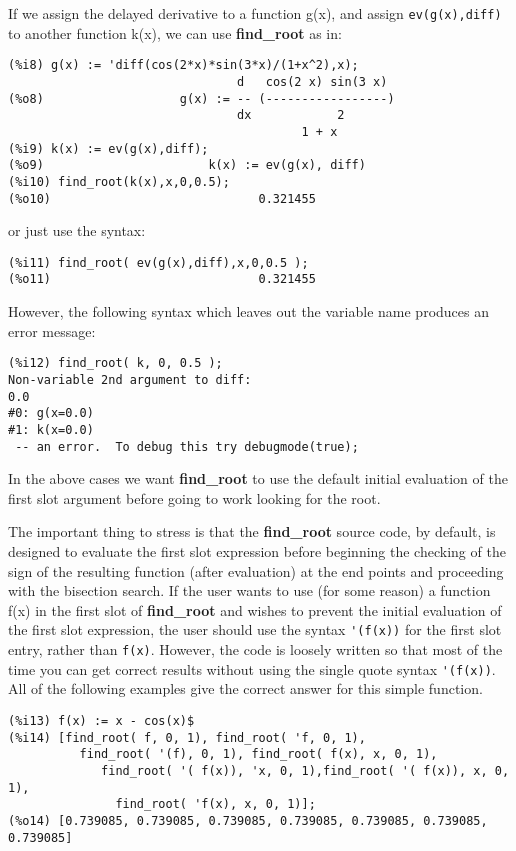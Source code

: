 \documentclass[12pt]{article}
\begin{document}
\normalsize
If we assign the delayed derivative to a function g(x), and
  assign \verb|ev(g(x),diff)| to another function k(x), we can
  use \textbf{find\_root} as in:
\small
\begin{verbatim}
(%i8) g(x) := 'diff(cos(2*x)*sin(3*x)/(1+x^2),x);
                                d   cos(2 x) sin(3 x)
(%o8)                   g(x) := -- (-----------------)
                                dx            2
                                         1 + x
(%i9) k(x) := ev(g(x),diff);
(%o9)                       k(x) := ev(g(x), diff)
(%i10) find_root(k(x),x,0,0.5);
(%o10)                             0.321455
\end{verbatim}
\normalsize
or just use the syntax:
\small
\begin{verbatim}
(%i11) find_root( ev(g(x),diff),x,0,0.5 );
(%o11)                             0.321455
\end{verbatim}
\normalsize
However, the following syntax which leaves out the variable name
   produces an error message:
\small
\begin{verbatim}
(%i12) find_root( k, 0, 0.5 );
Non-variable 2nd argument to diff:
0.0
#0: g(x=0.0)
#1: k(x=0.0)
 -- an error.  To debug this try debugmode(true);
\end{verbatim}
\normalsize

In the above cases we want \textbf{find\_root} to use the default initial
  evaluation of the first slot argument before going to work looking for the root.

The important thing to stress is that the \textbf{find\_root} source code, by default, is designed
  to evaluate the first slot expression before beginning the checking of the sign of the resulting
  function (after evaluation) at the end points and proceeding with the bisection search.
If the user wants to use (for some reason) a function f(x) in the first slot of \textbf{find\_root}
  and wishes to prevent the initial evaluation of the first slot expression, the user
  should use the syntax \verb|'(f(x))| for the first slot entry, rather than \verb|f(x)|.
However, the code is loosely written so that most of the time you can get correct results
  without using the single quote syntax \verb|'(f(x))|.
All of the following examples give the correct answer for this simple function.
\small
\begin{verbatim}
(%i13) f(x) := x - cos(x)$
(%i14) [find_root( f, 0, 1), find_root( 'f, 0, 1),
          find_root( '(f), 0, 1), find_root( f(x), x, 0, 1),
             find_root( '( f(x)), 'x, 0, 1),find_root( '( f(x)), x, 0, 1),
               find_root( 'f(x), x, 0, 1)];
(%o14) [0.739085, 0.739085, 0.739085, 0.739085, 0.739085, 0.739085, 0.739085]
\end{verbatim}
\normalsize
\end{document}
